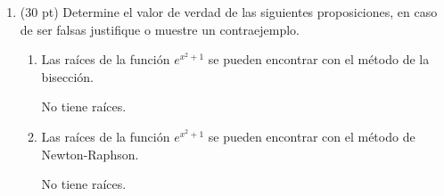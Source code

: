 \documentclass[11pt]{article}
\begin{document}
\begin{enumerate}
\item (30 pt) Determine el valor de verdad de las siguientes proposiciones, en caso de ser falsas justifique o muestre un contraejemplo.
\begin{enumerate}
\item
{} 
    \begin{minipage}{0.4\textwidth}
	Las ra\'ices de la funci\'on $e^{x^2+1}$ se pueden encontrar con el m\'etodo de la bisecci\'on.
    \end{minipage} 
    \begin{minipage}{0.4\textwidth}
    No tiene raíces. 
    
    \end{minipage}
%
\item
{} 
    \begin{minipage}{0.4\textwidth}
	Las ra\'ices de la funci\'on $e^{x^2+1}$ se pueden encontrar con el m\'etodo de Newton-Raphson.
    \end{minipage} 
    \begin{minipage}{0.4\textwidth}
    No tiene raíces.
    

\end{minipage}
\end{enumerate}
\end{enumerate}
\end{document}
